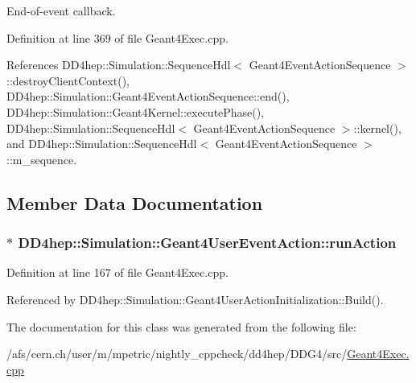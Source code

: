 End-\/of-\/event callback. 

Definition at line 369 of file Geant4Exec.cpp.

References DD4hep::Simulation::SequenceHdl$<$ Geant4EventActionSequence $>$::destroyClientContext(), DD4hep::Simulation::Geant4EventActionSequence::end(), DD4hep::Simulation::Geant4Kernel::executePhase(), DD4hep::Simulation::SequenceHdl$<$ Geant4EventActionSequence $>$::kernel(), and DD4hep::Simulation::SequenceHdl$<$ Geant4EventActionSequence $>$::m\_\-sequence.

\subsection{Member Data Documentation}
\hypertarget{class_d_d4hep_1_1_simulation_1_1_geant4_user_event_action_ac97fb9f30ba15e30d50897aabc0ad004}{
\subsubsection[{runAction}]{$\ast$ {\bf DD4hep::Simulation::Geant4UserEventAction::runAction}}}
\label{class_d_d4hep_1_1_simulation_1_1_geant4_user_event_action_ac97fb9f30ba15e30d50897aabc0ad004}


Definition at line 167 of file Geant4Exec.cpp.

Referenced by DD4hep::Simulation::Geant4UserActionInitialization::Build().

The documentation for this class was generated from the following file:\begin{DoxyCompactItemize}
\item 
/afs/cern.ch/user/m/mpetric/nightly\_\-cppcheck/dd4hep/DDG4/src/\hyperlink{_geant4_exec_8cpp}{Geant4Exec.cpp}\end{DoxyCompactItemize}
